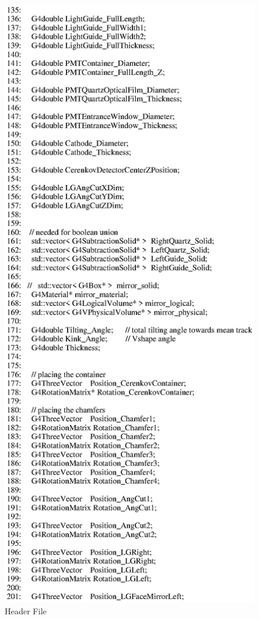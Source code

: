 \begin{figure}[ht]
  \hspace{0cm}
  \includegraphics[scale=0.8]{./figures5/QweakSimCerenkovDetector.hh-p3.eps}
  \caption{Header File}
           \label{fig:V-SC-3}
\end{figure}
\clearpage

